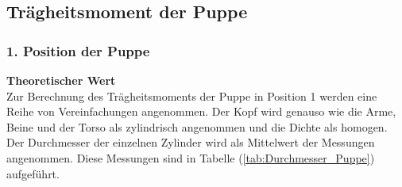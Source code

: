   \subsection{Trägheitsmoment der Puppe}
    \subsubsection{1. Position der Puppe}
      \textbf{Theoretischer Wert}\\
        Zur Berechnung des Trägheitsmoments der Puppe in Position 1 werden eine Reihe von Vereinfachungen angenommen. Der Kopf wird genauso
        wie die Arme, Beine und der Torso als zylindrisch angenommen und die Dichte als homogen. Der Durchmesser der einzelnen Zylinder wird 
        als Mittelwert der Messungen angenommen. Diese Messungen sind in Tabelle (\ref{tab:Durchmesser_Puppe}) aufgeführt. 

